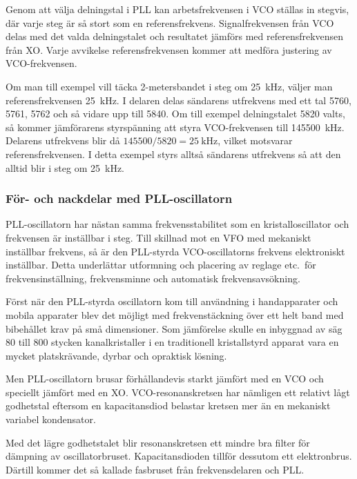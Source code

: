 Genom att välja delningstal i PLL kan arbetsfrekvensen i VCO ställas
in stegvis, där varje steg är så stort som en referensfrekvens.
Signalfrekvensen från VCO delas med det valda delningstalet och resultatet
jämförs med referensfrekvensen från XO.
Varje avvikelse referensfrekvensen kommer att medföra justering av
VCO-frekvensen.

Om man till exempel vill täcka 2-metersbandet i steg om \SI{25}{\kilo\hertz},
väljer man referensfrekvensen \SI{25}{\kilo\hertz}.
I delaren delas sändarens utfrekvens med ett tal 5760, 5761, 5762 och så vidare
upp till 5840.
Om till exempel delningstalet 5820 valts, så kommer jämförarens styrspänning att
styra VCO-frekvensen till \SI{145500}{\kilo\hertz}.
Delarens utfrekvens blir då \(145500/5820 = \SI{25}{\kilo\hertz}\), vilket
motsvarar referensfrekvensen.
I detta exempel styrs alltså sändarens utfrekvens så att den alltid blir i steg
om \SI{25}{\kilo\hertz}.

\subsubsection{För- och nackdelar med PLL-oscillatorn}

PLL-oscillatorn har nästan samma frekvensstabilitet som en
kristalloscillator och frekvensen är inställbar i steg.
Till skillnad mot en VFO med mekaniskt inställbar frekvens, så är den PLL-styrda
VCO-oscillatorns frekvens elektroniskt inställbar.
Detta underlättar utformning och placering av reglage etc.\ för
frekvensinställning, frekvensminne och automatisk frekvensavsökning.

Först när den PLL-styrda oscillatorn kom till användning i handapparater och
mobila apparater blev det möjligt med frekvenstäckning över ett helt band med
bibehållet krav på små dimensioner.
Som jämförelse skulle en inbyggnad av säg 80 till 800 stycken kanalkristaller
i en traditionell kristallstyrd apparat vara en mycket platskrävande, dyrbar
och opraktisk lösning.

Men PLL-oscillatorn brusar förhållandevis starkt jämfört med en VCO och
speciellt jämfört med en XO.
VCO-resonanskretsen har nämligen ett relativt lågt godhetstal eftersom en
kapacitansdiod belastar kretsen mer än en mekaniskt variabel kondensator.

Med det lägre godhetstalet blir resonanskretsen ett mindre bra
filter för dämpning av oscillatorbruset.
Kapacitansdioden tillför dessutom ett elektronbrus.
Därtill kommer det så kallade fasbruset från frekvensdelaren och PLL.

